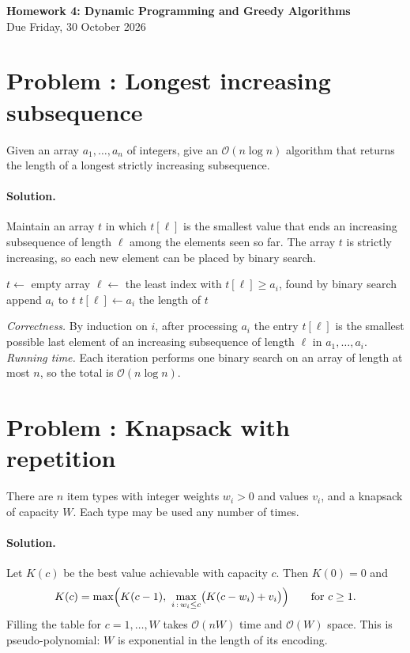 \documentclass[11pt]{article}
\newcounter{problem}
\newcommand{\problem}[1]{\stepcounter{problem}\section*{Problem \theproblem: #1}}
\newcommand{\bigO}{\mathcal{O}}
\begin{document}
\begin{center}
  {\Large \textbf{Homework 4: Dynamic Programming and Greedy Algorithms}} \\[4pt]
  Due Friday, 30 October 2026
\end{center}

\problem{Longest increasing subsequence}

Given an array $a_1, \dots, a_n$ of integers, give an $\bigO(n \log n)$ algorithm that returns the length of a longest strictly increasing subsequence.

\paragraph{Solution.} Maintain an array $t$ in which $t[\ell]$ is the smallest value that ends an increasing subsequence of length $\ell$ among the elements seen so far. The array $t$ is strictly increasing, so each new element can be placed by binary search.

\begin{algorithm}[h]
  \caption{Longest increasing subsequence}
  \begin{algorithmic}[1]
      \State $t \gets$ empty array
        \State $\ell \gets$ the least index with $t[\ell] \ge a_i$, found by binary search
          \State append $a_i$ to $t$
        \Else
          \State $t[\ell] \gets a_i$
        \EndIf
      \EndFor
      \State \Return the length of $t$
    \EndFunction
  \end{algorithmic}
\end{algorithm}

\emph{Correctness.} By induction on $i$, after processing $a_i$ the entry $t[\ell]$ is the smallest possible last element of an increasing subsequence of length $\ell$ in $a_1, \dots, a_i$. \emph{Running time.} Each iteration performs one binary search on an array of length at most $n$, so the total is $\bigO(n \log n)$.

\problem{Knapsack with repetition}

There are $n$ item types with integer weights $w_i > 0$ and values $v_i$, and a knapsack of capacity $W$. Each type may be used any number of times.

\paragraph{Solution.} Let $K(c)$ be the best value achievable with capacity $c$. Then $K(0) = 0$ and
\[
  K(c) = \max\Bigl( K(c - 1), \ \max_{i \,:\, w_i \le c} \bigl( K(c - w_i) + v_i \bigr) \Bigr) \qquad \text{for } c \ge 1 .
\]
Filling the table for $c = 1, \dots, W$ takes $\bigO(nW)$ time and $\bigO(W)$ space. This is pseudo-polynomial: $W$ is exponential in the length of its encoding.
\end{document}
